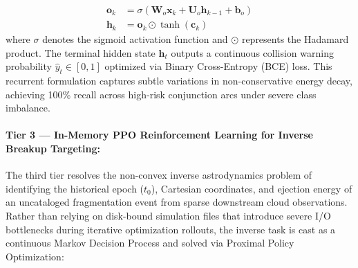\begin{enumerate}
\begin{align}
    \mathbf{o}_k &= \sigma(\mathbf{W}_o \mathbf{x}_k + \mathbf{U}_o \mathbf{h}_{k-1} + \mathbf{b}_o) \label{eq:lstm_o} \\
    \mathbf{h}_k &= \mathbf{o}_k \odot \tanh(\mathbf{c}_k) \label{eq:lstm_h}
    \end{align}
    where $\sigma$ denotes the sigmoid activation function and $\odot$ represents the Hadamard product. The terminal hidden state $\mathbf{h}_t$ outputs a continuous collision warning probability $\hat{y}_t \in [0, 1]$ optimized via Binary Cross-Entropy (BCE) loss. This recurrent formulation captures subtle variations in non-conservative energy decay, achieving 100\% recall across high-risk conjunction arcs under severe class imbalance.
\end{enumerate}

\paragraph{Tier 3 --- In-Memory PPO Reinforcement Learning for Inverse Breakup Targeting:}
The third tier resolves the non-convex inverse astrodynamics problem of identifying the historical epoch ($t_0$), Cartesian coordinates, and ejection energy of an uncataloged fragmentation event from sparse downstream cloud observations. Rather than relying on disk-bound simulation files that introduce severe I/O bottlenecks during iterative optimization rollouts, the inverse task is cast as a continuous Markov Decision Process and solved via Proximal Policy Optimization:
